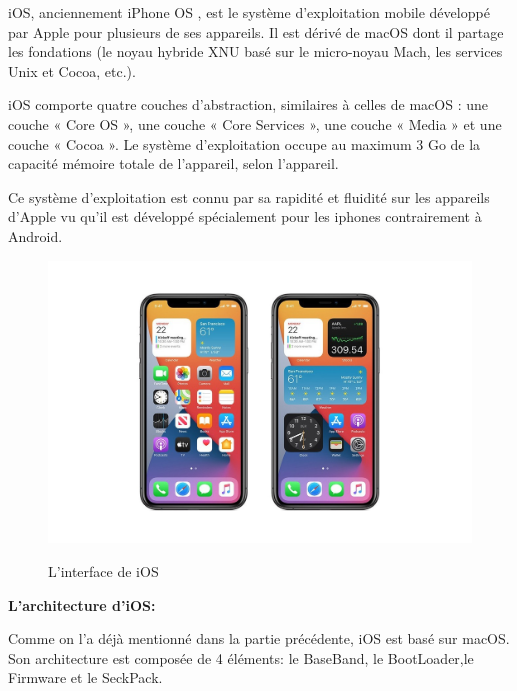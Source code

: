 iOS, anciennement iPhone OS , est le système d'exploitation mobile développé par Apple pour plusieurs de ses appareils. Il est dérivé de macOS dont il partage les fondations (le noyau hybride XNU basé sur le micro-noyau Mach, les services Unix et Cocoa, etc.).

iOS comporte quatre couches d'abstraction, similaires à celles de macOS : une couche « Core OS », une couche « Core Services », une couche « Media » et une couche « Cocoa ». Le système d'exploitation occupe au maximum 3 Go de la capacité mémoire totale de l'appareil, selon l'appareil.~\cite{IOS2020}

Ce système d'exploitation est connu par sa rapidité et fluidité sur les appareils d'Apple vu qu'il est développé spécialement pour les iphones contrairement à Android.

\begin{figure}[!ht]
    \centering
    \includegraphics[width=5in]{images/Chapitre1/iosui.jpg}
    \label{fig:ios Ui}
    \caption{L'interface de iOS}
\end{figure}
\newpage
\tab \textbf{L'architecture d'iOS:}\medskip

Comme on l'a déjà mentionné dans la partie précédente, iOS est basé sur macOS. Son architecture est composée de 4 éléments: le BaseBand, le BootLoader,le Firmware et le SeckPack.

